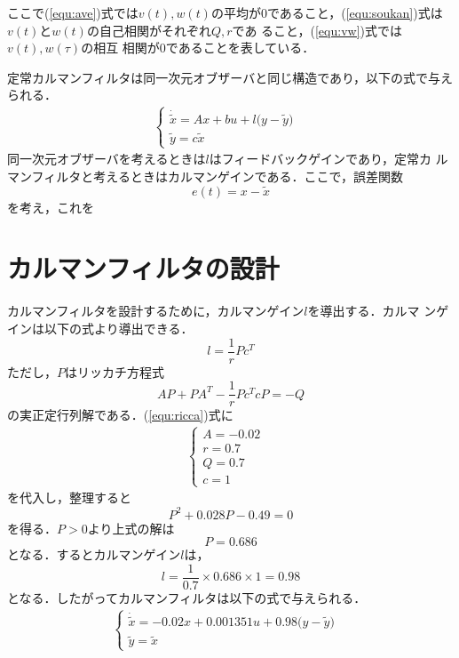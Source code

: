 \documentclass[a4paper,12pt]{jarticle}
\begin{document}
%
ここで(\ref{equ:ave})式では$v(t),w(t)$の平均が0であること，(\ref{equ:soukan})式は
$v(t)$と$w(t)$の自己相関がそれぞれ$Q,r$であ
ること，(\ref{equ:vw})式では$v(t),w(\tau)$の相互
相関が0であることを表している．

定常カルマンフィルタは同一次元オブザーバと同じ構造であり，以下の式で与え
られる．
%
\begin{eqnarray}
 \begin{cases}
\dot{\tilde{x}} = Ax + bu + l \big(y - \tilde{y} \big)
  & \\
  \tilde{y} = c\tilde{x}
 \end{cases}
\end{eqnarray}
%
同一次元オブザーバを考えるときは$l$はフィードバックゲインであり，定常カ
ルマンフィルタと考えるときはカルマンゲインである．ここで，誤差関数
\begin{equation}
 e(t) = x - \tilde{x}
\end{equation}
を考え，これを
\section{カルマンフィルタの設計}
カルマンフィルタを設計するために，カルマンゲイン$l$を導出する．カルマ
ンゲインは以下の式より導出できる．
\begin{equation}\label{equ:gain}
 l = \frac{1}{r}Pc^T
\end{equation}
ただし，$P$はリッカチ方程式
\begin{equation}\label{equ:ricca}
 AP + PA^T -\frac{1}{r}Pc^TcP = -Q 
\end{equation}
の実正定行列解である．(\ref{equ:ricca})式に
\begin{eqnarray}
 \begin{cases}
  A = -0.02 & \\
  r = 0.7 & \\
  Q = 0.7 & \\
  c = 1
 \end{cases}
\end{eqnarray}
を代入し，整理すると
\begin{equation}
 P^2 + 0.028P -0.49 = 0
\end{equation}
を得る．$P > 0$より上式の解は
\begin{equation}
 P = 0.686
\end{equation}
となる．するとカルマンゲイン$l$は，
\begin{equation}
 l = \frac{1}{0.7} \times 0.686 \times 1 = 0.98
\end{equation}
となる．したがってカルマンフィルタは以下の式で与えられる．
\begin{eqnarray}
 \begin{cases}
\dot{\tilde{x}} = -0.02x + 0.001351u + 0.98 \big(y - \tilde{y} \big)
  & \\
  \tilde{y} = \tilde{x}
 \end{cases}
\end{eqnarray}
\end{document}

